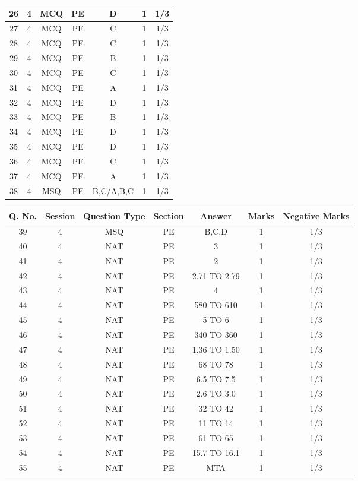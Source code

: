 \begin{tabular}[12pt]{|c|c|c|c|c|c|c|}
\hline
26&4&MCQ&PE&D&1&1/3\\
\hline
27&4&MCQ&PE&C&1&1/3\\
\hline
28&4&MCQ&PE&C&1&1/3\\
\hline
29&4&MCQ&PE&B&1&1/3\\
\hline
30&4&MCQ&PE&C&1&1/3\\
\hline
31&4&MCQ&PE&A&1&1/3\\
\hline
32&4&MCQ&PE&D&1&1/3\\
\hline
33&4&MCQ&PE&B&1&1/3\\
\hline
34&4&MCQ&PE&D&1&1/3\\
\hline
35&4&MCQ&PE&D&1&1/3\\
\hline
36&4&MCQ&PE&C&1&1/3\\
\hline
37&4&MCQ&PE&A&1&1/3\\
\hline
38&4&MSQ&PE&B,C/A,B,C&1&1/3\\
\hline
\end{tabular}
\newpage
\begin{tabular}[12pt]{|c|c|c|c|c|c|c|}
\hline
Q. No.&Session&Question Type&Section&Answer&Marks&Negative Marks\\
\hline
39&4&MSQ&PE&B,C,D&1&1/3\\
\hline
40&4&NAT&PE&3&1&1/3\\
\hline
41&4&NAT&PE&2&1&1/3\\
\hline
42&4&NAT&PE&2.71 TO 2.79&1&1/3\\
\hline
43&4&NAT&PE&4&1&1/3\\
\hline
44&4&NAT&PE&580 TO 610&1&1/3\\
\hline
45&4&NAT&PE&5 TO 6&1&1/3\\
\hline
46&4&NAT&PE&340 TO 360&1&1/3\\
\hline
47&4&NAT&PE&1.36 TO 1.50&1&1/3\\
\hline
48&4&NAT&PE&68 TO 78&1&1/3\\
\hline
49&4&NAT&PE&6.5 TO 7.5&1&1/3\\
\hline
50&4&NAT&PE&2.6 TO 3.0&1&1/3\\
\hline
51&4&NAT&PE&32 TO 42&1&1/3\\
\hline
52&4&NAT&PE&11 TO 14&1&1/3\\
\hline
53&4&NAT&PE&61 TO 65&1&1/3\\
\hline
54&4&NAT&PE&15.7 TO 16.1&1&1/3\\
\hline
55&4&NAT&PE&MTA&1&1/3\\
\hline
\end{tabular}
